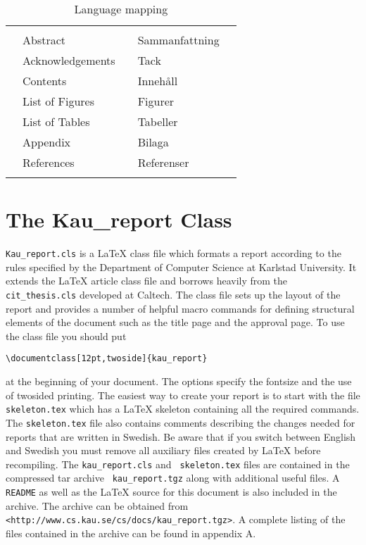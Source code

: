 \documentclass[12pt,twoside]{kau_report}
\begin{document}
\begin{table}[htb]
\vspace{5mm}
\begin{center}
\begin{tabular}{|clclc|}
\hline
& & & & \\
& Abstract & & Sammanfattning & \\
& Acknowledgements & & Tack & \\
& Contents & & Inneh{\aa}ll & \\
& List of Figures & & Figurer & \\
& List of Tables & & Tabeller & \\
& Appendix & & Bilaga & \\
& References & & Referenser & \\
& & & & \\
\hline
\end{tabular}
\end{center}
\caption{Language mapping}
\label{map}
\end{table}

\section{The Kau\_report Class}
{\tt Kau\_report.cls} is a LaTeX class file which formats a report
according to the rules specified by the Department of Computer Science
at Karlstad University. It extends the LaTeX article class file
and borrows heavily from the {\tt
cit\_thesis.cls} developed at Caltech. The class file sets up the
layout of the report and provides a number of helpful macro 
commands for defining structural elements of the 
document such as the title page and the approval page. 
To use the class file you should put
\begin{center}
\verb|\documentclass[12pt,twoside]{kau_report}|
\end{center}
at the beginning of your document. The options specify the fontsize and
the use of twosided printing.
The easiest way to create your report is to start with
the file {\tt skeleton.tex} which has a LaTeX skeleton containing all
the required commands. The {\tt skeleton.tex} file also contains
comments describing the changes needed for reports that are written in
Swedish. Be aware that if you switch between English and Swedish you
must remove all auxiliary files created by LaTeX before
recompiling. The {\tt kau\_report.cls} and {\tt 
skeleton.tex} files are contained in the compressed tar archive {\tt
kau\_report.tgz} along with additional useful files. A {\tt README} as
well as the LaTeX source for this document is also included in the
archive. The archive can be obtained from {\tt
<http://www.cs.kau.se/cs/docs/kau\_report.tgz>}. A complete listing of the files
contained in the archive can be found in appendix A.
\end{document}
